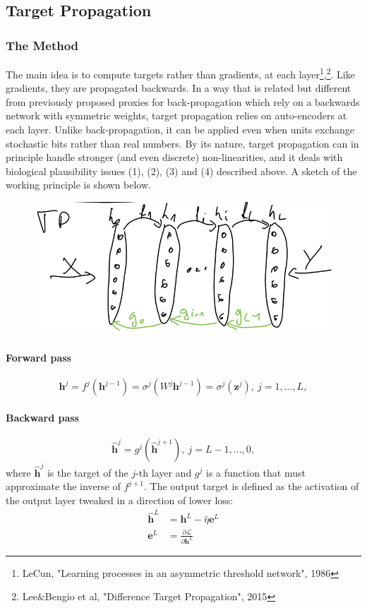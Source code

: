 \documentclass[main]{subfiles}
\begin{document}
\subsection{Target Propagation}

\subsubsection{The Method}
The main idea is to compute targets rather than gradients, at each layer\footnote{LeCun, "Learning processes in an asymmetric threshold network", 1986},\footnote{Lee\&Bengio et al, "Difference Target Propagation", 2015}. Like gradients, they are propagated backwards. In a way that is related but different from previously proposed proxies for back-propagation which rely on a backwards network with symmetric weights, target propagation relies on auto-encoders at each layer. Unlike back-propagation, it can be applied even when units exchange stochastic bits rather than real numbers. By its nature, target propagation can in principle handle stronger (and even discrete) non-linearities, and it deals with biological plausibility issues (1), (2), (3) and (4) described above. A sketch of the working principle is shown below. 

\begin{figure}[H]
	\centering
	\includegraphics[width=0.7\linewidth]{02_TrainingMethodsForDeepANNs/figures/target_propagation.png}
	\caption{}
	\label{fig:targetprop}
\end{figure}

\paragraph{Forward pass}
\begin{equation}
	\bm{h}^j = f^j(\bm{h}^{j-1}) = \sigma^j(W^j\bm{h}^{j-1}) = \sigma^j(\bm{z}^j),\ j=1, ..., L ,
\end{equation}

\paragraph{Backward pass}
\begin{equation}
	\bm{\hat{h}}^j = g^j(\bm{\hat{h}}^{j+1}),\ j=L-1, ..., 0 ,
\end{equation}
where $\bm{\hat{h}}^j$ is the target of the $j$-th layer and $g^j$ is a function that must approximate the inverse of $f^{j+1}$. The output target is defined as the activation of the output layer tweaked in a direction of lower loss:
\begin{align}
	\bm{\hat{h}}^L &= \bm{h}^L - \hat{\eta}\bm{e}^L\\
	\bm{e}^L &= \frac{\partial \mathcal{L}}{\partial \bm{h}^L}
\end{align}
\end{document}
